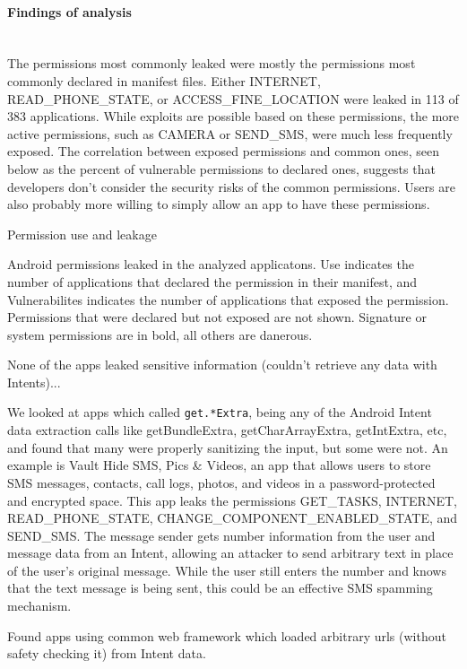 \documentclass[12pt,a4paper]{article}
\begin{document}
\paragraph{Findings of analysis} ~\\
The permissions most commonly leaked were mostly the permissions most commonly
declared in manifest files. Either INTERNET, READ\_PHONE\_STATE, or
ACCESS\_FINE\_LOCATION were leaked in 113 of 383 applications. While exploits
are possible based on these permissions, the more active permissions, such as
CAMERA or SEND\_SMS, were much less frequently exposed. The correlation between
exposed permissions and common ones, seen below as the percent of vulnerable
permissions to declared ones, suggests that developers don't consider the
security risks of the common permissions. Users are also probably more willing
to simply allow an app to have these permissions.
\begin{table}
\caption{Permission use and leakage}

\caption*{Android permissions leaked in the analyzed applicatons. Use indicates
  the number of applications that declared the permission in their
  manifest, and Vulnerabilites indicates the number of applications that
  exposed the permission.  Permissions that were declared but not exposed
  are not shown. Signature or system permissions are in bold, all others
  are danerous.}
\end{table}
None of the apps leaked sensitive information (couldn't retrieve any data with
Intents)...

We looked at apps which called \texttt{get.*Extra}, being any of the Android
Intent data extraction calls like getBundleExtra, getCharArrayExtra,
getIntExtra, etc, and found that many were properly sanitizing the input, but
some were not. An example is Vault Hide SMS, Pics \& Videos, an app that allows
users to store SMS messages, contacts, call logs, photos, and videos in a
password-protected and encrypted space. This app leaks the permissions
GET\_TASKS, INTERNET, READ\_PHONE\_STATE, CHANGE\_COMPONENT\_ENABLED\_STATE, and
SEND\_SMS. The message sender gets number information from the user and message
data from an Intent, allowing an attacker to send arbitrary text in place of the
user's original message. While the user still enters the number and knows that
the text message is being sent, this could be an effective SMS spamming
mechanism.

Found apps using common web framework which loaded arbitrary urls (without
safety checking it) from Intent data.
\end{document}
